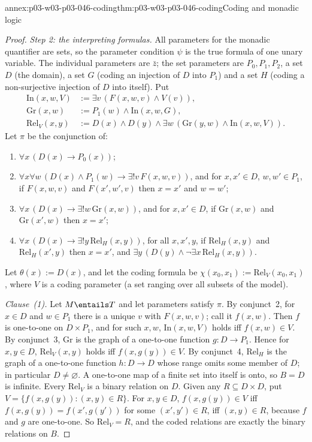 \begin{annexitem}{annex:p03-w03-p03-046-coding}{thm:p03-w03-p03-046-coding}{Coding and monadic logic}
\begin{proof}
\emph{Step 2: the interpreting formulas.} All parameters for the
monadic quantifier are sets, so the parameter condition \(\psi\) is the
true formula of one unary variable. The individual parameters are
\(\bar z\); the set parameters are \(P_0,P_1,P_2\), a set \(D\) (the
domain), a set \(G\) (coding an injection of \(D\) into \(P_1\)) and a set
\(H\) (coding a non-surjective injection of \(D\) into itself). Put
\begin{align*}
\mathrm{In}(x,w,V)&:=\exists v\,(F(x,w,v)\wedge V(v)),\\
\mathrm{Gr}(x,w)&:=P_1(w)\wedge\mathrm{In}(x,w,G),\\
\mathrm{Rel}_V(x,y)&:=D(x)\wedge D(y)\wedge\exists w\,(\mathrm{Gr}(y,w)\wedge\mathrm{In}(x,w,V)).
\end{align*}
Let \(\pi\) be the conjunction of:
\begin{enumerate}
  \item \(\forall x\,(D(x)\to P_0(x))\);
  \item \(\forall x\forall w\,(D(x)\wedge P_1(w)\to\exists!v\,F(x,w,v))\), and
        for \(x,x'\in D\), \(w,w'\in P_1\), if \(F(x,w,v)\) and
        \(F(x',w',v)\) then \(x=x'\) and \(w=w'\);
  \item \(\forall x\,(D(x)\to\exists!w\,\mathrm{Gr}(x,w))\), and for
        \(x,x'\in D\), if \(\mathrm{Gr}(x,w)\) and \(\mathrm{Gr}(x',w)\) then
        \(x=x'\);
  \item \(\forall x\,(D(x)\to\exists!y\,\mathrm{Rel}_H(x,y))\), for all
        \(x,x',y\), if \(\mathrm{Rel}_H(x,y)\) and \(\mathrm{Rel}_H(x',y)\)
        then \(x=x'\), and \(\exists y\,(D(y)\wedge\neg\exists
        x\,\mathrm{Rel}_H(x,y))\).
\end{enumerate}
Let \(\theta(x):=D(x)\), and let the coding formula be
\(\chi(x_0,x_1):=\mathrm{Rel}_{V}(x_0,x_1)\), where \(V\) is a coding
parameter (a set ranging over all subsets of the model).

\emph{Clause~(1).} Let \(M\entails T\) and let parameters satisfy \(\pi\).
By conjunct~2, for \(x\in D\) and \(w\in P_1\) there is a unique \(v\) with
\(F(x,w,v)\); call it \(f(x,w)\). Then \(f\) is one-to-one on
\(D\times P_1\), and for such \(x,w\), \(\mathrm{In}(x,w,V)\) holds iff
\(f(x,w)\in V\). By conjunct~3, \(\mathrm{Gr}\) is the graph of a one-to-one
function \(g\colon D\to P_1\). Hence for \(x,y\in D\),
\(\mathrm{Rel}_V(x,y)\) holds iff \(f(x,g(y))\in V\). By conjunct~4,
\(\mathrm{Rel}_H\) is the graph of a one-to-one function \(h\colon D\to D\)
whose range omits some member of \(D\); in particular \(D\neq\varnothing\).
A one-to-one map of a finite set into itself is onto, so \(B=D\) is
infinite. Every \(\mathrm{Rel}_V\) is a binary relation on \(D\). Given
any \(R\subseteq D\times D\), put \(V=\{f(x,g(y)):(x,y)\in R\}\). For
\(x,y\in D\), \(f(x,g(y))\in V\) iff \(f(x,g(y))=f(x',g(y'))\) for some
\((x',y')\in R\), iff \((x,y)\in R\), because \(f\) and \(g\) are
one-to-one. So \(\mathrm{Rel}_V=R\), and the coded relations are exactly
the binary relations on \(B\).


\end{proof}
\end{annexitem}

